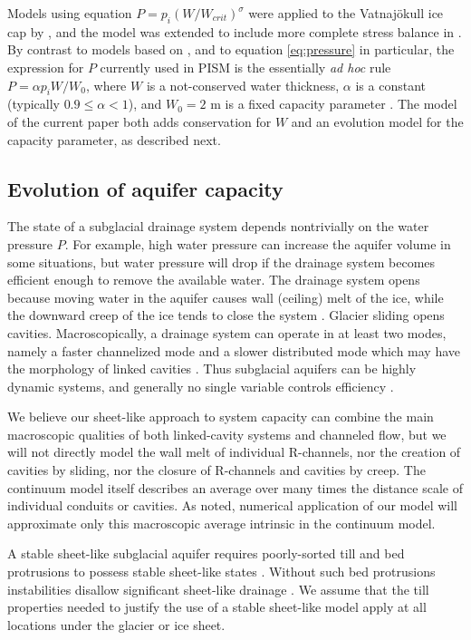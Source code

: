 \documentclass[11pt]{amsart}
\begin{document}
Models using equation $P = p_i (W/W_{crit})^\sigma$ were applied to the Vatnaj\"okull ice cap by \citet{Flowersetal2005}, and the model was extended to include more complete stress balance in \citet{PimentelFlowersSchoof2010}.  By contrast to models based on \citep{FlowersClarke2002_theory}, and to equation \eqref{eq:pressure} in particular, the expression for $P$ currently used in PISM is the essentially \emph{ad hoc} rule $P = \alpha p_i W/W_0$, where $W$ is a not-conserved water thickness, $\alpha$ is a constant (typically $0.9\le \alpha < 1$), and $W_0=2$ m is a fixed capacity parameter \citep[equation (20)]{BBssasliding}.  The model of the current paper both adds conservation for $W$ and an evolution model for the capacity parameter, as described next.


\subsection*{Evolution of aquifer capacity}  The state of a subglacial drainage system depends nontrivially on the water pressure $P$.  For example, high water pressure can increase the aquifer volume in some situations, but water pressure will drop if the drainage system becomes efficient enough to remove the available water.  The drainage system opens because moving water in the aquifer causes wall (ceiling) melt of the ice, while the downward creep of the ice tends to close the system \citep{Hewitt2011,Walder1982}.  Glacier sliding opens cavities.  Macroscopically, a drainage system can operate in at least two modes, namely a faster channelized mode and a slower distributed mode which may have the morphology of linked cavities \citep{Schoofmeltsupply}.  Thus subglacial aquifers can be highly dynamic systems, and generally no single variable controls efficiency \citep[e.g.][]{Bartholomausetal2008}.

We believe our sheet-like approach to system capacity can combine the main macroscopic qualities of both linked-cavity systems and channeled flow, but we will not directly model the wall melt of individual R-channels, nor the creation of cavities by sliding, nor the closure of R-channels and cavities by creep.  The continuum model itself describes an average over many times the distance scale of individual conduits or cavities.  As noted, numerical application of our model will approximate only this macroscopic average intrinsic in the continuum model. 

A stable sheet-like subglacial aquifer requires poorly-sorted till and bed protrusions to possess stable sheet-like states \citep{CreytsSchoof2009}.  Without such bed protrusions instabilities disallow significant sheet-like drainage \citep{Walder1982}.  We assume that the till properties needed to justify the use of a stable sheet-like model apply at all locations under the glacier or ice sheet.
\end{document}
